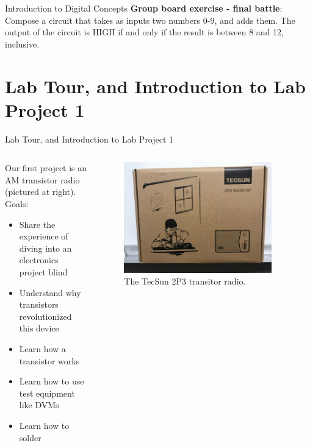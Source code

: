 \documentclass{beamer}
\begin{document}
\begin{frame}{Introduction to Digital Concepts}
\textbf{Group board exercise - final battle}:
Compose a circuit that takes as inputs two numbers 0-9, and adds them.  The output of the circuit is HIGH if and only if the result is between 8 and 12, inclusive.
\end{frame}

\section{Lab Tour, and Introduction to Lab Project 1}

\begin{frame}{Lab Tour, and Introduction to Lab Project 1}
\small
\begin{columns}[T]
\begin{column}{0.5\textwidth}
Our first project is an AM transistor radio (pictured at right). Goals:
\begin{itemize}
\item Share the experience of \alert{diving into an electronics project} blind
\item Understand why transistors revolutionized this device
\item Learn how a transistor works
\item Learn how to use test equipment like DVMs
\item Learn how to solder
\end{itemize}
\end{column}
\begin{column}{0.5\textwidth}
\begin{figure}
\centering
\includegraphics[width=0.9\textwidth]{figures/Tecsun.jpeg}
\caption{\label{fig:tec} The TecSun 2P3 transitor radio.}
\end{figure}
\end{column}
\end{columns}
\end{frame}
\end{document}
